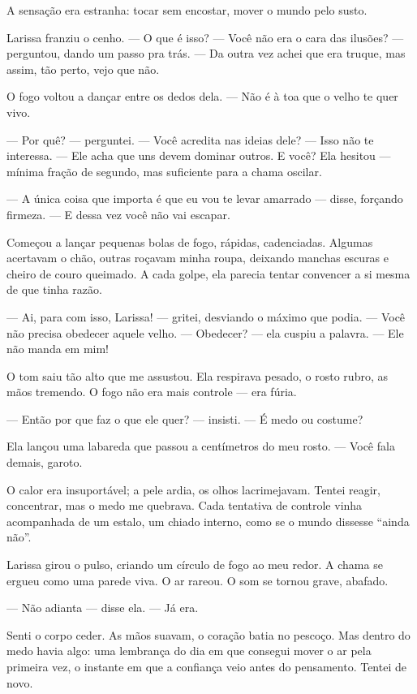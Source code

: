A sensação era estranha: tocar sem encostar, mover o mundo pelo susto.

Larissa franziu o cenho.  
— O que é isso?  
— Você não era o cara das ilusões? — perguntou, dando um passo pra trás. — Da outra vez achei que era truque, mas assim, tão perto, vejo que não.

O fogo voltou a dançar entre os dedos dela.  
— Não é à toa que o velho te quer vivo.

— Por quê? — perguntei. — Você acredita nas ideias dele?  
— Isso não te interessa.  
— Ele acha que uns devem dominar outros. E você?  
Ela hesitou — mínima fração de segundo, mas suficiente para a chama oscilar.

— A única coisa que importa é que eu vou te levar amarrado — disse, forçando firmeza. — E dessa vez você não vai escapar.

Começou a lançar pequenas bolas de fogo, rápidas, cadenciadas.  
Algumas acertavam o chão, outras roçavam minha roupa, deixando manchas escuras e cheiro de couro queimado.  
A cada golpe, ela parecia tentar convencer a si mesma de que tinha razão.

— Ai, para com isso, Larissa! — gritei, desviando o máximo que podia. — Você não precisa obedecer aquele velho.  
— Obedecer? — ela cuspiu a palavra. — Ele não manda em mim!

O tom saiu tão alto que me assustou.  
Ela respirava pesado, o rosto rubro, as mãos tremendo.  
O fogo não era mais controle — era fúria.

— Então por que faz o que ele quer? — insisti. — É medo ou costume?

Ela lançou uma labareda que passou a centímetros do meu rosto.  
— Você fala demais, garoto.

O calor era insuportável; a pele ardia, os olhos lacrimejavam.  
Tentei reagir, concentrar, mas o medo me quebrava.  
Cada tentativa de controle vinha acompanhada de um estalo, um chiado interno, como se o mundo dissesse “ainda não”.

Larissa girou o pulso, criando um círculo de fogo ao meu redor.  
A chama se ergueu como uma parede viva.  
O ar rareou.  
O som se tornou grave, abafado.

— Não adianta — disse ela. — Já era.

Senti o corpo ceder.  
As mãos suavam, o coração batia no pescoço.  
Mas dentro do medo havia algo: uma lembrança do dia em que consegui mover o ar pela primeira vez, o instante em que a confiança veio antes do pensamento.  
Tentei de novo.

